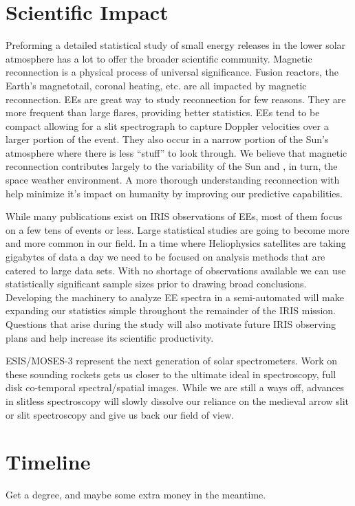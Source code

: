 \documentclass[]{aastex6}
\begin{document}
\section{Scientific Impact}
%
Preforming a detailed statistical study of small energy releases in the lower solar atmosphere has a lot to offer the broader scientific community. Magnetic reconnection is a physical process of universal significance. Fusion reactors, the Earth's magnetotail, coronal heating, etc. are all impacted by magnetic reconnection. EEs are great way to study reconnection for few reasons. They are more frequent than large flares, providing better statistics.  EEs tend to be compact allowing for a slit spectrograph to capture Doppler velocities over a larger portion of the event.  They also occur in a narrow portion of the Sun's atmosphere where there is less ``stuff'' to look through.  We believe that magnetic reconnection contributes largely to the variability of the Sun and , in turn, the space weather environment.  A more thorough understanding reconnection with help minimize it's impact on humanity by improving our predictive capabilities.

While many publications exist on IRIS observations of EEs, most of them focus on a few tens of events or less. Large statistical studies are going to become more and more common in our field.  In a time where Heliophysics satellites are taking gigabytes of data a day we need to be focused on analysis methods that are catered to large data sets.  With no shortage of observations available we can use statistically significant sample sizes prior to drawing broad conclusions. Developing the machinery to analyze EE spectra in a semi-automated will make expanding our statistics simple throughout the remainder of the IRIS mission.  Questions that arise during the study will also motivate future IRIS observing plans and help increase its scientific productivity.

ESIS/MOSES-3 represent the next generation of solar spectrometers.  Work on these sounding rockets gets us closer to the ultimate ideal in spectroscopy, full disk co-temporal spectral/spatial images.  While we are still a ways off, advances in slitless spectroscopy will slowly dissolve our reliance on the medieval arrow slit or slit spectroscopy and give us back our field of view.



 
\section{Timeline}
Get a  degree, and maybe some extra money in the meantime.





	
\end{document}
